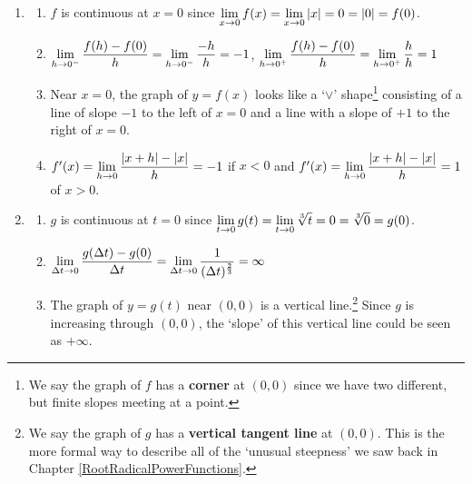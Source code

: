 \documentclass{ximera}
\begin{document}
\begin{enumerate}
\setcounter{enumi}{\value{HW}}

\item \begin{enumerate} \item  $f$ is continuous at $x=0$ since $\ds{\lim_{x \rightarrow 0} f(x) = \lim_{x \rightarrow 0} |x| = 0 = |0| = f(0)}$.

\smallskip

\item   $\ds{\lim_{h \rightarrow 0^{-}} \dfrac{f(h) - f(0)}{h} = \lim_{h \rightarrow 0^{-}} \dfrac{-h}{h}  =-1}$,  $\ds{\lim_{h \rightarrow 0^{+}} \dfrac{f(h) - f(0)}{h} = \lim_{h \rightarrow 0^{+}} \dfrac{h}{h}  = 1}$

\smallskip
        
\item  Near $x = 0$, the graph of $y = f(x)$ looks like a `$\vee$' shape\footnote{We say the graph of $f$ has a  \textbf{corner} at $(0,0)$ since we have two different, but finite slopes meeting at a point.} consisting of a line of slope $-1$ to the left of $x=0$ and a line with a slope of $+1$ to the right of $x = 0$.

\smallskip

\item  $f'(x) =  \ds{\lim_{h \rightarrow 0} \dfrac{|x+h| - |x|}{h} = -1}$ if $x < 0$ and $f'(x) =  \ds{\lim_{h \rightarrow 0} \dfrac{|x+h| - |x|}{h} = 1}$ of $x > 0$.

\smallskip

\end{enumerate}



\item \begin{enumerate}

\item  $g$ is continuous at $t=0$ since $\ds{\lim_{t \rightarrow 0} g(t) = \lim_{t \rightarrow 0} \sqrt[3]{t} = 0 = \sqrt[3]{0} = g(0)}$.

\smallskip

\item $\ds{\lim_{\Delta t \rightarrow 0} \dfrac{g(\Delta t) - g(0)}{\Delta t} =   \lim_{\Delta t \rightarrow 0} \dfrac{1}{(\Delta t)^{\frac{2}{3}}}   =  \infty}$

\smallskip

        
\item  The graph of $y = g(t)$ near $(0,0)$ is a vertical line.\footnote{We say the graph of $g$ has a  \textbf{vertical tangent line} at $(0,0)$.  This is the more formal way to describe all of the `unusual steepness' we saw back in Chapter \ref{RootRadicalPowerFunctions}.}  Since $g$ is increasing through $(0,0)$, the `slope' of this vertical line could be seen as $+ \infty$. 


\end{enumerate}
\end{enumerate}
\end{document}
